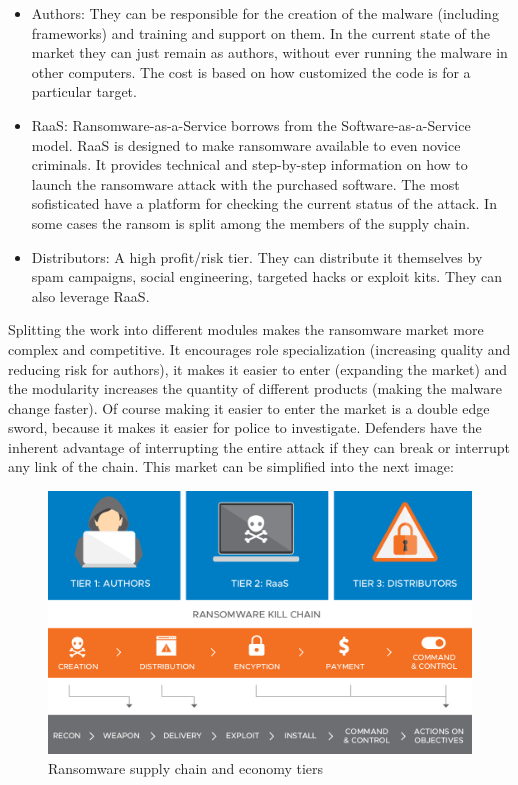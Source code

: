 \begin{itemize}
	\item Authors: They can be responsible for the creation of the malware (including frameworks) and training and support on them. In the current state of the market they can just remain as authors, without ever running the malware in other computers. The cost is based on how customized the code is for a particular target.
	\item RaaS: Ransomware-as-a-Service borrows from the Software-as-a-Service model. RaaS is designed to make ransomware available to even novice criminals. It provides technical and step-by-step information on how to launch the ransomware attack with the purchased software. The most sofisticated have a platform for checking the current status of the attack. In some cases the ransom is split among the members of the supply chain.
	\item Distributors: A high profit/risk tier. They can distribute it themselves by spam campaigns, social engineering, targeted hacks or exploit kits. They can also leverage RaaS.
\end{itemize}
\linej
Splitting the work into different modules makes the ransomware market more complex and competitive.
It encourages role specialization (increasing quality and reducing risk for authors), it makes it easier to enter (expanding the market) and the modularity increases the quantity of different products (making the malware change faster).
\linej
Of course making it easier to enter the market is a double edge sword, because it makes it easier for police to investigate.
Defenders have the inherent advantage of interrupting the entire attack if they can break or interrupt any link of the chain.
\linej
This market can be simplified into the next image:
\begin{figure}[H]
	\centering
	\includegraphics[width=\textwidth]{figuras/ransomware_chain.png}
	\caption{Ransomware supply chain and economy tiers\cite{ransomware_economy}}
\end{figure}
